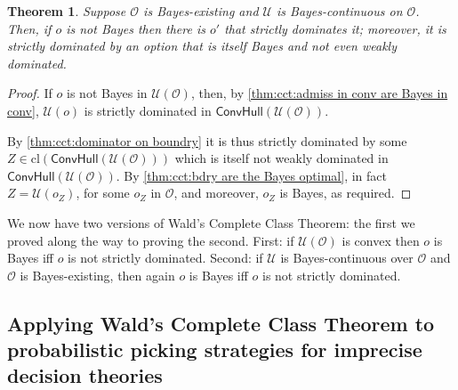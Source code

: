\documentclass[a4paper,final]{article}
\newtheorem{theorem}{Theorem}[section]
\newcommand\cl{\mathrm{cl}}
\renewcommand\O{\mathcal{O}}
\newcommand\Uwald{\mathcal{U}} %
\newcommand{\Conv}{\mathsf{ConvHull}}
\newenvironment{CCM rewritten}
{\begingroup\color{blue}} %
{\endgroup}              %
\begin{document}
%		
	\begin{theorem}\label{thm:cct}
		Suppose $\O$ is Bayes-existing and $\Uwald$ is Bayes-continuous on $\O$. Then, if $o$ is not Bayes then there is $o'$ that strictly dominates it; moreover, it is strictly dominated by an option that is itself Bayes and not even weakly dominated. 
	\end{theorem}
\begin{proof}
			If $o$ is not Bayes in $\Uwald(\O)$, then, by \cref{thm:cct:admiss in conv are Bayes in conv}, $\Uwald(o)$ is strictly dominated in $\Conv(\Uwald(\O))$. 
	
	By \cref{thm:cct:dominator on boundry} it is thus strictly dominated by some $Z\in\cl(\Conv(\Uwald(\O)))$ which is itself not weakly dominated in $\Conv(\Uwald(\O))$. By \cref{thm:cct:bdry are the Bayes optimal}, in fact $Z = \Uwald(o_Z)$, for some $o_Z$ in $\O$, and moreover, $o_Z$ is Bayes, as required.
\end{proof}


We now have two versions of Wald's Complete Class Theorem: the first we proved along the way to proving the second. First: if $\Uwald(\O)$ is convex then $o$ is Bayes iff $o$ is not strictly dominated. Second: if $\Uwald$ is Bayes-continuous over $\O$ and $\O$ is Bayes-existing, then again $o$ is Bayes iff $o$ is not strictly dominated.

\subsection{Applying Wald's Complete Class Theorem to probabilistic picking strategies for imprecise decision theories}\label{sect:wald-app:appendix}
\end{document}
